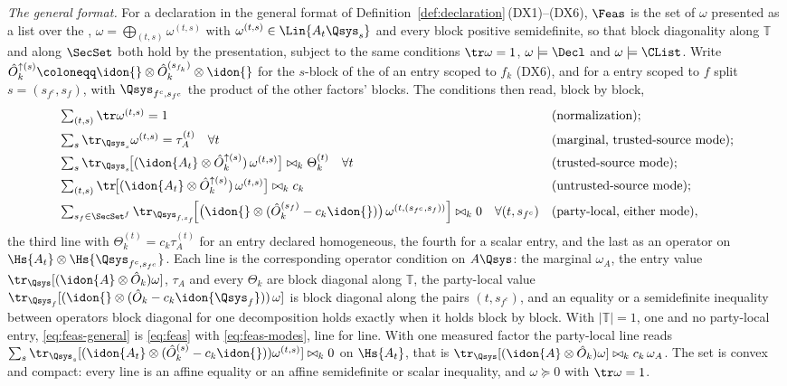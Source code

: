 \begin{definition}
\emph{The general format.} For a declaration in the general format of
Definition~\ref{def:declaration}\,(DX1)--(DX6), $\Feas$ is the set of
$\omega$ presented as a list over the
,
$\omega=\bigoplus_{(t,s)}\omega^{(t,s)}$ with
$\omega^{(t,s)}\in\Lin{A_t\Qsys_s}$ and every block positive semidefinite, so
that block diagonality along $\mathbb{T}$ and along $\SecSet$ both hold by
the presentation, subject to the same conditions $\tr\omega=1$,
$\omega\models\Decl$ and $\omega\models\CList$. Write
$\hat O^{\uparrow(s)}_k\coloneqq\idon{}\otimes\hat O^{(s_{f_k})}_k\otimes\idon{}$
for the $s$-block of the  of an entry scoped to $f_k$
(DX6), and for a  entry scoped to $f$ split
$s=(s_{f^c},s_f)$, with $\Qsys_{f^c,s_{f^c}}$ the product of the other
factors' blocks. The conditions then read, block by block,
\begin{equation}\label{eq:feas-general}
\begin{aligned}
  &\textstyle\sum_{(t,s)}\tr\omega^{(t,s)}=1
  &&\text{(normalization)};\\
  &\textstyle\sum_{s}\tr_{\Qsys_s}\omega^{(t,s)}=\tau^{(t)}_A
  \quad\forall t
  &&\text{(marginal, trusted-source mode)};\\
  &\textstyle\sum_{s}\tr_{\Qsys_s}\!\big[(\idon{A_t}\otimes
  \hat O^{\uparrow(s)}_k)\,\omega^{(t,s)}\big]\bowtie_k\Theta^{(t)}_k
  \quad\forall t
  &&\text{(trusted-source mode)};\\
  &\textstyle\sum_{(t,s)}\tr\!\big[(\idon{A_t}\otimes
  \hat O^{\uparrow(s)}_k)\,\omega^{(t,s)}\big]\bowtie_kc_k
  &&\text{(untrusted-source mode)};\\
  &\textstyle\sum_{s_f\in\SecSet^{f}}\tr_{\Qsys_{f,s_f}}\!\Big[\big(\idon{}
  \otimes(\hat O^{(s_f)}_k-c_k\idon{})\big)\,
  \omega^{(t,(s_{f^c},s_f))}\Big]\bowtie_k0
  \quad\forall(t,s_{f^c})
  &&\text{(party-local, either mode)},
\end{aligned}
\end{equation}
the third line with $\Theta^{(t)}_k=c_k\tau^{(t)}_A$ for an entry declared
homogeneous, the fourth for a scalar entry, and the last as an operator on
$\Hs{A_t}\otimes\Hs{\Qsys_{f^c,s_{f^c}}}$. Each
line is the corresponding operator condition on $A\Qsys$: the marginal
$\omega_A$, the entry value $\tr_{\Qsys}[(\idon{A}\otimes\hat O_k)\omega]$,
$\tau_A$ and every $\Theta_k$ are block diagonal along $\mathbb{T}$, the
party-local value
$\tr_{\Qsys_f}[(\idon{}\otimes(\hat O_k-c_k\idon{\Qsys_f}))\,\omega]$ is block
diagonal along the pairs $(t,s_{f^c})$, and an equality or a semidefinite
inequality between operators block diagonal for one decomposition holds
exactly when it holds block by block. With $|\mathbb{T}|=1$, one
 and no party-local entry, \eqref{eq:feas-general} is
\eqref{eq:feas} with \eqref{eq:feas-modes}, line for line. With one measured
factor the party-local line reads
$\sum_s\tr_{\Qsys_s}[(\idon{A_t}\otimes(\hat O^{(s)}_k-c_k\idon{}))
\omega^{(t,s)}]\bowtie_k0$ on $\Hs{A_t}$, that is
$\tr_{\Qsys}[(\idon{A}\otimes\hat O_k)\omega]\bowtie_kc_k\,\omega_A$. The
set is convex and compact: every line is an affine equality or an affine
semidefinite or scalar inequality, and $\omega\succeq0$ with $\tr\omega=1$.
\end{definition}
